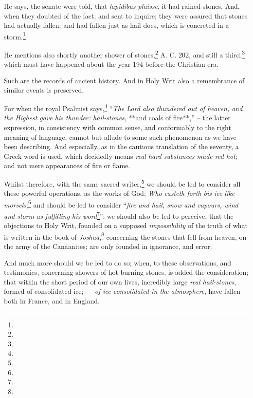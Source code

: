 \documentclass[a4paper, 12pt, oneside]{article}
\begin{document}
He says, the senate were told, that \emph{lapidibus pluisse}, it had rained stones. And, when they doubted of the fact; and sent to inquire; they were assured that stones had actually fallen; and had fallen just as hail does, which is concreted in a storm.\footnote{}

He mentions also shortly another shower of stones,\footnote{} A. C. 202, and still a third,\footnote{} which must have happened about the year 194 before the Christian era.

Such are the records of ancient history. And in Holy Writ also a remembrance of similar events is preserved.

For when the royal Psalmist says,\footnote{} ``\emph{The Lord also thundered out of heaven, and the Highest gave his thunder: hail-stones}, **and coals of fire**,'' -- the latter expression, in consistency with common sense, and conformably to the right meaning of language, cannot but allude to some such phenomenon as we have been describing. And especially, as in the cautious translation of the seventy, a Greek word is used, which decidedly means \emph{real hard substances made red hot}; and not mere appearances of fire or flame.

Whilst therefore, with the same sacred writer,\footnote{} we should be led to consider all these powerful operations, as the works of God; \emph{Who casteth forth bis ice like morsels};\footnote{} and should be led to consider ``\emph{fire and hail, snow and vapours, wind and storm as fulfilling his word}\footnote{}''; we should also be led to perceive, that the objections to Holy Writ, founded on a supposed \emph{impossibility} of the truth of what is written in the book of \emph{Joshua},\footnote{} concerning the stones that fell from heaven, on the army of the Canaanites; are only founded in ignorance, and error.

And much more should we be led to do so; when, to these observations, and testimonies, concerning showers of hot burning stones, is added the consideration; that within the short period of our own lives, incredibly large \emph{real hail-stones}, formed of consolidated ice; --- \emph{of ice consolidated in the atmosphere}, have fallen both in France, and in England.
\end{document}
